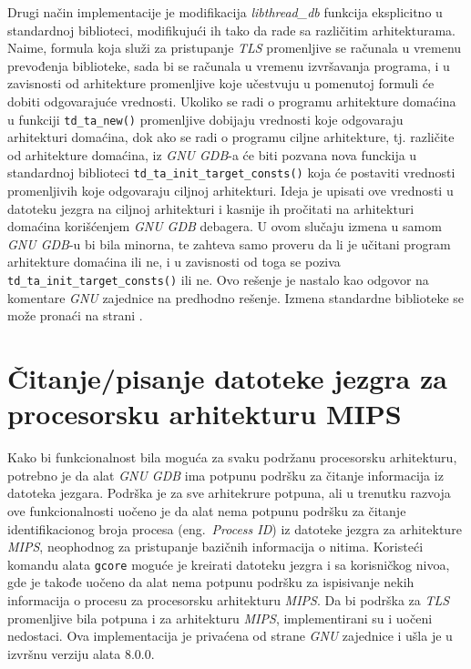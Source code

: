 \documentclass[12pt,oneside]{memoir}
\begin{document}
Drugi način implementacije je modifikacija \emph{libthread\_db} funkcija eksplicitno u standardnoj biblioteci, modifikujući ih tako da rade sa različitim arhitekturama. Naime, formula koja služi za pristupanje \emph{TLS} promenljive se računala u vremenu prevođenja biblioteke, sada bi se računala u vremenu izvršavanja programa, i u zavisnosti od arhitekture promenljive koje učestvuju u pomenutoj formuli će dobiti odgovarajuće vrednosti. Ukoliko se radi o programu arhitekture domaćina u funkciji  \texttt{td\_ta\_new()} promenljive dobijaju vrednosti koje odgovaraju arhitekturi domaćina, dok ako se radi o programu ciljne arhitekture, tj. različite od arhitekture domaćina, iz \emph{GNU GDB}-a će biti pozvana nova funckija u standardnoj biblioteci \texttt{td\_ta\_init\_target\_consts()} koja će postaviti vrednosti promenljivih koje odgovaraju ciljnoj arhitekturi. Ideja je upisati ove vrednosti u datoteku jezgra na ciljnoj arhitekturi i kasnije ih pročitati na arhitekturi domaćina korišćenjem \emph{GNU GDB} debagera. U ovom slučaju izmena u samom \emph{GNU GDB}-u bi bila minorna, te zahteva samo proveru da li je učitani program arhitekture domaćina ili ne, i u zavisnosti od toga se poziva \texttt{td\_ta\_init\_target\_consts()} ili ne. Ovo rešenje je nastalo kao odgovor na komentare \emph{GNU} zajednice na predhodno rešenje. Izmena standardne biblioteke se može pronaći na strani \cite{GLIBCPATCH}.

\section{Čitanje/pisanje datoteke jezgra za procesorsku arhitekturu MIPS}

Kako bi funkcionalnost bila moguća za svaku podržanu procesorsku arhitekturu, potrebno je da alat \emph{GNU GDB} ima potpunu podršku za čitanje informacija iz datoteka jezgara. Podrška je za sve arhitekrure potpuna, ali u trenutku razvoja ove funkcionalnosti uočeno je da alat nema potpunu podršku za čitanje identifikacionog broja procesa (eng.~\emph{Process ID}) iz datoteke jezgra za arhitekture \emph{MIPS}, neophodnog za pristupanje bazičnih informacija o nitima. Koristeći komandu alata \texttt{gcore} moguće je kreirati datoteku jezgra i sa korisničkog nivoa, gde je takođe uočeno da alat nema potpunu podršku za ispisivanje nekih informacija o procesu za procesorsku arhitekturu \emph{MIPS}. Da bi podrška za \emph{TLS} promenljive bila potpuna i za arhitekturu \emph{MIPS}, implementirani su i uočeni nedostaci. Ova implementacija je privaćena od strane \emph{GNU} zajednice i ušla je u izvršnu verziju alata 8.0.0.
\end{document}
